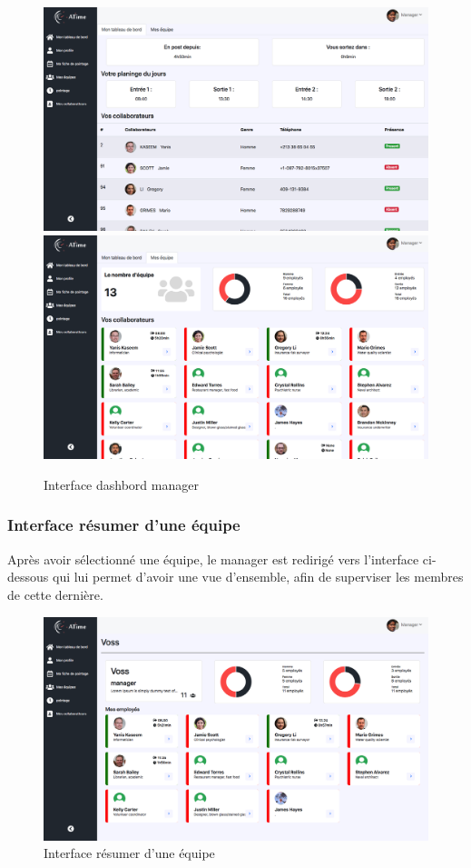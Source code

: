 \begin{figure}[h!]
    \centering
    \includegraphics[scale=0.326 ]{images/interface/dashbord_manager1.png}
    \includegraphics[scale=0.326 ]{images/interface/dashbord_manager.png}
    \caption{Interface dashbord manager}
    \label{fig96}
\end{figure}
                
\subsubsection*{Interface résumer d'une équipe}
Après avoir sélectionné une équipe, le manager est redirigé vers l'interface 
ci-dessous qui lui permet d'avoir une vue d'ensemble, afin de superviser les 
membres de cette dernière.
\begin{figure}[h!]
    \centering
    \includegraphics[scale=0.35 ]{images/interface/team_view.png}
    \caption{Interface résumer d'une équipe}
    \label{fig97}
\end{figure}

